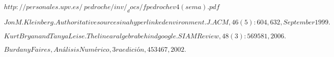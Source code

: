 \begin{thebibliography}{9}

  $http://personales.upv.es/~pedroche/inv/_docs/fpedrochev4(sema).pdf$

$Jon M. Kleinberg. Authoritative sources in a hyperlinked environment. J. ACM,
46(5):604,632, September 1999.$

$Kurt Bryan and Tanya Leise. The linear algebra behind google. SIAM Review, 48(3):569
581, 2006.$

$Burdan y Faires, Análisis Numérico, 3ra edición, 453
467, 2002.$


\end{thebibliography}